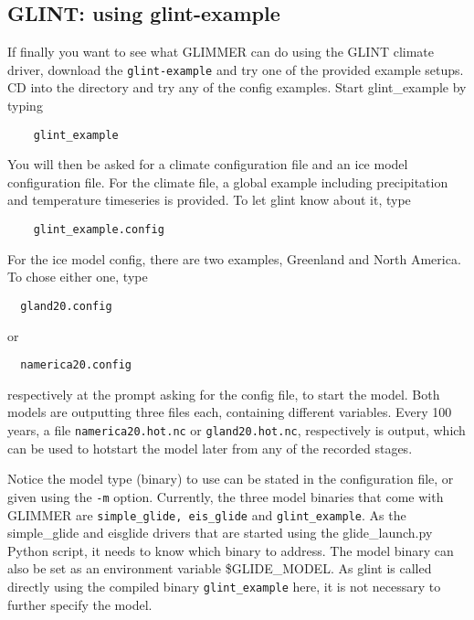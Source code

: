 
\subsection{GLINT: using glint-example}
If finally you want to see what GLIMMER can do using the GLINT climate driver,
download the \texttt{glint-example} and try one of the provided example setups.
CD into the directory and try any of the config examples. Start glint\_example
by typing
\begin{verbatim}
    glint_example
\end{verbatim}
You will then be asked for a climate configuration file and an ice model 
configuration file.
For the climate file, a global example including precipitation and temperature timeseries
is provided. To let glint know about it, type
\begin{verbatim}
    glint_example.config
\end{verbatim}
For the ice model config, there are two examples, Greenland and North America. To chose either one, type
\begin{verbatim}
  gland20.config
\end{verbatim}
or
\begin{verbatim}
  namerica20.config
\end{verbatim}
respectively at the prompt asking for the config file, to start the model.
Both models are outputting three files each, containing different variables.
Every 100 years, a file \texttt{namerica20.hot.nc} or \texttt{gland20.hot.nc}, respectively is output, 
which can be used to hotstart the model later from any of the recorded stages.

Notice the model type (binary) to use can be stated in the configuration file,
or given using the \texttt{-m} option. Currently, the three model binaries that
come with GLIMMER are \texttt{simple\_glide, eis\_glide} and
\texttt{glint\_example}. As the simple\_glide and eis\-glide drivers that are started using the glide\_launch.py Python script,
 it needs to know which binary to address. The model binary can also be set as an environment variable \$GLIDE\_MODEL. 
As glint is called directly using the compiled binary \texttt{glint\_example} here, it is not necessary to further 
specify the model.

